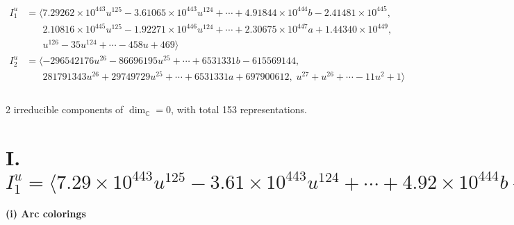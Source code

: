 \documentclass[1p]{elsarticle_modified}
\theoremstyle{definition}
\begin{document}
\begin{align*}
I^u_{1}&=\langle 
7.29262\times10^{443} u^{125}-3.61065\times10^{443} u^{124}+\cdots+4.91844\times10^{444} b-2.41481\times10^{445},\\
\phantom{I^u_{1}}&\phantom{= \langle  }2.10816\times10^{445} u^{125}-1.92271\times10^{446} u^{124}+\cdots+2.30675\times10^{447} a+1.44340\times10^{449},\\
\phantom{I^u_{1}}&\phantom{= \langle  }u^{126}-35 u^{124}+\cdots-458 u+469\rangle \\
I^u_{2}&=\langle 
-296542176 u^{26}-86696195 u^{25}+\cdots+6531331 b-615569144,\\
\phantom{I^u_{2}}&\phantom{= \langle  }281791343 u^{26}+29749729 u^{25}+\cdots+6531331 a+697900612,\;u^{27}+u^{26}+\cdots-11 u^2+1\rangle \\
\\
\end{align*}
\raggedright * 2 irreducible components of $\dim_{\mathbb{C}}=0$, with total 153 representations.\\
\newpage
\renewcommand{\arraystretch}{1}
\centering \section*{I. $I^u_{1}= \langle 7.29\times10^{443} u^{125}-3.61\times10^{443} u^{124}+\cdots+4.92\times10^{444} b-2.41\times10^{445},\;2.11\times10^{445} u^{125}-1.92\times10^{446} u^{124}+\cdots+2.31\times10^{447} a+1.44\times10^{449},\;u^{126}-35 u^{124}+\cdots-458 u+469 \rangle$}
\flushleft \textbf{(i) Arc colorings}\\
\end{document}

